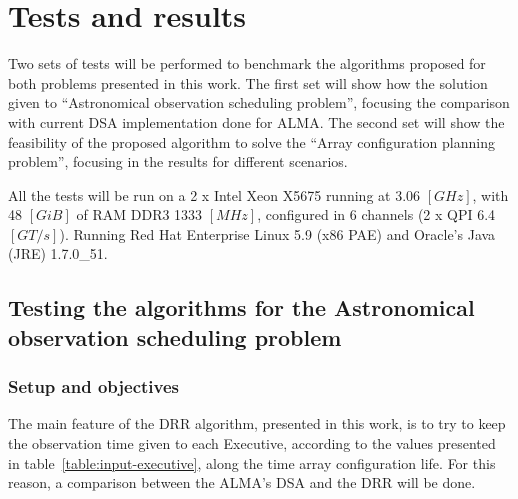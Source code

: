 \newpage
\section{Tests and results}

Two sets of tests will be performed to benchmark the algorithms proposed for both problems presented in this work.
The first set will show how the solution given to ``Astronomical observation scheduling problem'', focusing the comparison with current DSA implementation done for ALMA.
The second set will show the feasibility of the proposed algorithm to solve the ``Array configuration planning problem'', focusing in the results for different scenarios.

All the tests will be run on a 2 x Intel Xeon X5675 running at 3.06 $[GHz]$, with 48 $[GiB]$ of RAM DDR3 1333 $[MHz]$, configured in 6 channels (2 x QPI 6.4 $[GT/s]$). Running Red Hat Enterprise Linux 5.9 (x86 PAE) and Oracle's Java (JRE) 1.7.0\_51.

\subsection{Testing the algorithms for the Astronomical observation scheduling problem}

\subsubsection{Setup and objectives}
The main feature of the DRR algorithm, presented in this work, is to try to keep the observation time given to each Executive, according to the values presented in table~\ref{table:input-executive}, along the time array configuration life. For this reason, a comparison between the ALMA's DSA and the DRR will be done. 

